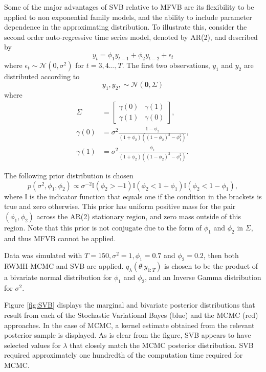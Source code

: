 \documentclass[
12pt, %
onehalfspacing, %
nohyperref, %
headsepline, %
chapterinoneline, %
]{MastersDoctoralThesis} %
\begin{document}
Some of the major advantages of SVB relative to MFVB are its flexibility to be applied to non exponential family models, and the ability to include parameter dependence in the approximating distribution. To illustrate this, consider the second order auto-regressive time series model, denoted by AR(2), and described by 
\begin{equation}
\label{SVBTS:AR2}
y_t = \phi_1 y_{t-1} + \phi_2 y_{t-2} + \epsilon_t
\end{equation}
where $\epsilon_t \sim \mathcal{N}(0, \sigma^2)$ for $t = 3, 4 \ldots, T$. The first two observations, $y_1$ and $y_2$ are distributed according to 
\begin{equation}
\label{SVBTS:Initial}
y_1, y_2, \sim \mathcal{N}(\boldsymbol{0}, \Sigma)
\end{equation}
where 
\begin{align}
\Sigma &= \left[ \begin{array}{cc} \gamma(0) & \gamma(1) \\ \gamma(1) & \gamma(0) \end{array} \right], \nonumber \\
\gamma(0) &= \sigma^2 \frac{1-\phi_2}{(1+\phi_2)((1-\phi_2)^2 - \phi_1^2)} \nonumber, \\
\gamma(1) &= \sigma^2 \frac{\phi_1}{(1+\phi_2)((1-\phi_2)^2 - \phi_1^2)} \nonumber.
\end{align}

The following prior distribution is chosen
\begin{equation}
p(\sigma^2, \phi_1, \phi_2) \propto \sigma^{-2} \mathbb{I}(\phi_2 > -1)\mathbb{I}(\phi_2 < 1 + \phi_1) \mathbb{I}(\phi_2 < 1 - \phi_1), 
\label{SVBTS:Prior}
\end{equation}
where $\mathbb{I}$ is the indicator function that equals one if the condition in the brackets is true and zero otherwise. This prior has uniform positive mass for the pair $(\phi_1, \phi_2)$ across the AR(2) stationary region, and zero mass outside of this region. Note that this prior is not conjugate due to the form of $\phi_1$ and $\phi_2$ in $\Sigma$, and thus MFVB cannot be applied. 

Data was simulated with $T = 150, \sigma^2 = 1, \phi_1 = 0.7$ and $\phi_2 = 0.2$, then both RWMH-MCMC and SVB are applied. $q_{\lambda}(\theta | y_{1:T})$ is chosen to be the product of a bivariate normal distribution for $\phi_1$ and $\phi_2$, and an Inverse Gamma distribution for $\sigma^2$.

Figure \ref{fig:SVB} displays the marginal and bivariate posterior distributions that result from each of the Stochastic Variational Bayes (blue) and the MCMC (red) approaches. In the case of MCMC, a kernel estimate obtained from the relevant posterior sample is displayed. As is clear from the figure, SVB appears to have selected values for $\lambda$ that closely match the MCMC posterior distribution. SVB required approximately one hundredth of the computation time required for MCMC.
\end{document}
